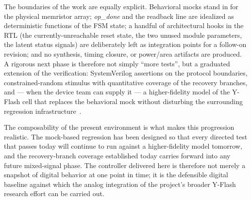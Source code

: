 The boundaries of the work are equally explicit. Behavioral mocks
stand in for the physical memristor array; \emph{op\_done} and the
readback line are idealized as deterministic functions of the FSM
state; a handful of architectural hooks in the RTL (the
currently-unreachable reset state, the two unused module parameters,
the latent status signals) are deliberately left as integration
points for a follow-on revision; and no synthesis, timing closure, or
power/area artifacts are produced. A rigorous next phase is therefore
not simply ``more tests'', but a graduated extension of the
verification: SystemVerilog assertions on the protocol boundaries,
constrained-random stimulus with quantitative coverage of the
recovery branches, and --- when the device team can supply it --- a
higher-fidelity model of the Y-Flash cell that replaces the
behavioral mock without disturbing the surrounding regression
infrastructure~\cite{Ielmini2018RRAM, Sebastian2020IMC,
Wang2022YFlash}.

The composability of the present environment is what makes this
progression realistic. The mock-based regression has been designed so
that every directed test that passes today will continue to run
against a higher-fidelity model tomorrow, and the recovery-branch
coverage established today carries forward into any future
mixed-signal phase. The controller delivered here is therefore not
merely a snapshot of digital behavior at one point in time; it is the
defensible digital baseline against which the analog integration of
the project's broader Y-Flash research effort can be carried out.
